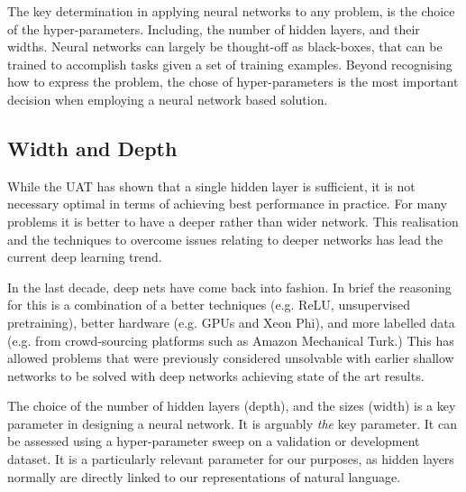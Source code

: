 \documentclass[12pt,parskip]{komatufte}\right
\begin{document}
The key determination in applying neural networks to any problem,
is the choice of the hyper-parameters.
Including, the number of hidden layers, and their widths.
Neural networks can largely be thought-off as black-boxes,
that can be trained to  accomplish tasks given a set of training examples.
Beyond recognising how to express the problem,
the chose of hyper-parameters is the most important decision when employing a neural network based solution.


\subsection{Width and Depth}
While the UAT has shown that a single hidden layer is sufficient,
it is not necessary optimal in terms of achieving best performance in practice.
For many problems it is better to have a deeper rather than wider network.
This realisation and the techniques to overcome issues relating to deeper networks has lead the current deep learning trend.

In the last decade, deep nets have come back into fashion.
In brief the reasoning for this is a combination of a better techniques (e.g. ReLU, unsupervised pretraining),
better hardware (e.g. GPUs and Xeon Phi), and more labelled data (e.g. from crowd-sourcing platforms such as Amazon Mechanical Turk.)
This has allowed problems that were previously considered unsolvable with earlier shallow networks to be solved with deep networks achieving state of the art results.


The choice of the number of hidden layers (depth),
and the sizes (width) is a key parameter in designing a neural network.
It is arguably \emph{the} key parameter.
It can be assessed using a hyper-parameter sweep on a validation or development dataset.
It is a particularly relevant parameter for our purposes, as hidden layers normally are directly linked to our representations of natural language.
\end{document}
